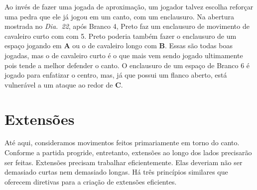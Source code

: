Ao invés de fazer uma jogada de aproximação, um jogador talvez escolha reforçar uma pedra que ele já jogou em um canto, com um enclausuro. Na abertura mostrada no \emph{Dia.\@~22}, após Branco 4, Preto faz um enclausuro de movimento de cavaleiro curto com com 5. Preto poderia também fazer o enclausuro de um espaço jogando em \textbf{A} ou o de cavaleiro longo com \textbf{B}. Essas são todas boas jogadas, mas o de cavaleiro curto é o que mais vem sendo jogado ultimamente pois tende a melhor defender o canto. O enclausuro de um espaço de Branco 6 é jogado para enfatizar o centro, mas, já que possui um flanco aberto, está vulnerável a um ataque ao redor de \textbf{C}.

\pagebreak

\section{Extensões}\label{sec:6.6:extensions}

Até aqui, consideramos movimentos feitos primariamente em torno do canto. Conforme a partida progride, entretanto, extensões ao longo dos lados precisarão ser feitas. Extensões precisam trabalhar eficientemente. Elas deveriam não ser demasiado curtas nem demasiado longas. Há três princípios similares que oferecem diretivas para a criação de extensões eficientes.

